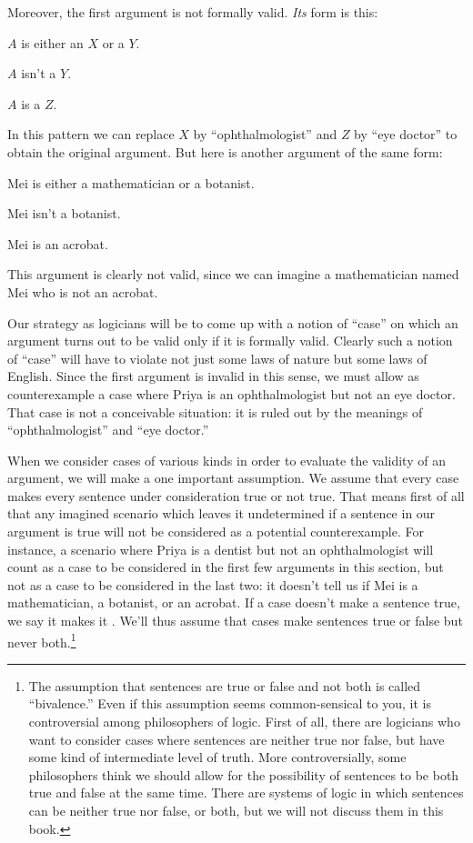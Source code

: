 Moreover, the first argument is not formally valid. \emph{Its} form is this:
\begin{earg}
	\item[] $A$ is either an $X$ or a $Y$.
	\item[] $A$ isn't a $Y$.
	\item[\texttherefore] $A$ is a $Z$.
\end{earg}
In this pattern we can replace $X$ by ``ophthalmologist'' and $Z$ by ``eye doctor'' to obtain the original argument.  But here is another argument of the same form:
\begin{earg}
	\item[] Mei is either a mathematician or a botanist.
	\item[] Mei isn't a botanist.
	\item[\texttherefore] Mei is an acrobat.
\end{earg}
This argument is clearly not valid, since we can imagine a mathematician named Mei who is not an acrobat.

Our strategy as logicians will be to come up with a notion of ``case''
on which an argument turns out to be valid only if it is formally
valid. Clearly such a notion of ``case'' will have to violate not just
some laws of nature but some laws of English. Since the first argument
is invalid in this sense, we must allow as counterexample a case where
Priya is an ophthalmologist but not an eye doctor.  That case is not a
conceivable situation: it is ruled out by the meanings of
``ophthalmologist'' and ``eye doctor.''

When we consider cases of various kinds in order to evaluate the
validity of an argument, we will make a one important assumption. We
assume that every case makes every sentence under consideration true
or not true. That means first of all that any imagined scenario which
leaves it undetermined if a sentence in our argument is true will not
be considered as a potential counterexample. For instance, a scenario
where Priya is a dentist but not an ophthalmologist will count as a
case to be considered in the first few arguments in this section, but
not as a case to be considered in the last two: it doesn't tell us if
Mei is a mathematician, a botanist, or an acrobat. If a case doesn't
make a sentence true, we say it makes it . We'll thus
assume that cases make sentences true or false but never
both.\footnote{The assumption that sentences are true or false and not
both is called ``bivalence.'' Even if this assumption seems
common-sensical to you, it is controversial among philosophers of
logic. First of all, there are logicians who want to consider cases
where sentences are neither true nor false, but have some kind of
intermediate level of truth. More controversially, some philosophers
think we should allow for the possibility of sentences to be both true
and false at the same time. There are systems of logic in which
sentences can be neither true nor false, or both, but we will not
discuss them in this book.}

